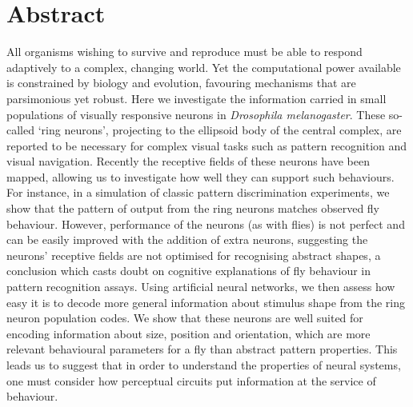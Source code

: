 \section*{Abstract}
All organisms wishing to survive and reproduce must be able to respond adaptively to a complex, changing world. Yet the computational power available is constrained by biology and evolution, favouring mechanisms that are parsimonious yet robust. Here we investigate the information carried in small populations of visually responsive neurons in \emph{Drosophila melanogaster}. These so-called `ring neurons', projecting to the ellipsoid body of the central complex, are reported to be necessary for complex visual tasks such as pattern recognition and visual navigation. Recently the receptive fields of these neurons have been mapped, allowing us to investigate how well they can support such behaviours. For instance, in a simulation of classic pattern discrimination experiments, we show that the pattern of output from the ring neurons matches observed fly behaviour. However, performance of the neurons (as with flies) is not perfect and can be easily improved with the addition of extra neurons, suggesting the neurons' receptive fields are not optimised for recognising abstract shapes, a conclusion which casts doubt on cognitive explanations of fly behaviour in pattern recognition assays. Using artificial neural networks, we then assess how easy it is to decode more general information about stimulus shape from the ring neuron population codes. We show that these neurons are well suited for encoding information about size, position and orientation, which are more relevant behavioural parameters for a fly than abstract pattern properties. This leads us to suggest that in order to understand the properties of neural systems, one must consider how perceptual circuits put information at the service of behaviour.


